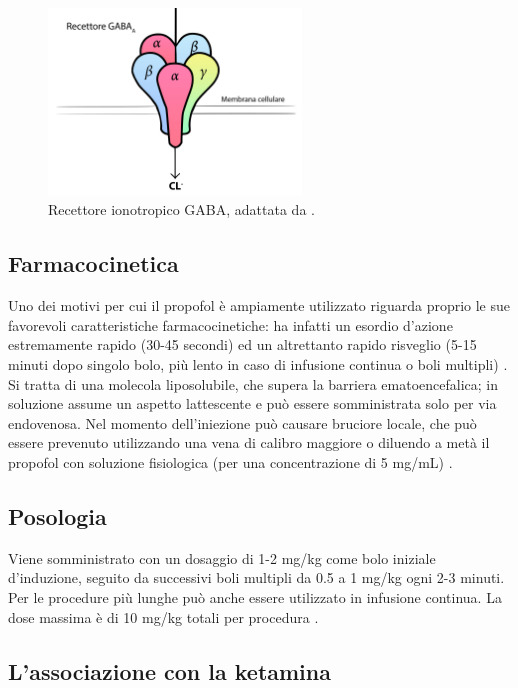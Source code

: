 \begin{figure}[h]
    \centering
    \includegraphics[width=0.6\textwidth]{Figure/GABAps.jpg}
    \caption{Recettore ionotropico GABA, adattata da \cite{vinkers2012}.}
    \label{fig:GABAps}
\end{figure}

\subsection*{Farmacocinetica}

Uno dei motivi per cui il propofol è ampiamente utilizzato riguarda proprio le sue favorevoli caratteristiche farmacocinetiche: ha infatti un esordio d'azione estremamente rapido (30-45 secondi) ed un altrettanto rapido risveglio (5-15 minuti dopo singolo bolo, più lento in caso di infusione continua o boli multipli) \cite{Simeupsedazione, Uptodatepharmacology}. Si tratta di una molecola liposolubile, che supera la barriera ematoencefalica; in soluzione assume un aspetto lattescente e può essere somministrata solo per via endovenosa. Nel momento dell'iniezione può causare bruciore locale, che può essere prevenuto utilizzando una vena di calibro maggiore o diluendo a metà il propofol con soluzione fisiologica (per una concentrazione di 5 mg/mL) \cite{Simeupsedazione}. 

\subsection*{Posologia}

Viene somministrato con un dosaggio di 1-2 mg/kg come bolo iniziale d'induzione, seguito da successivi boli multipli da 0.5 a 1 mg/kg ogni 2-3 minuti. Per le procedure più lunghe può anche essere utilizzato in infusione continua.
La dose massima è di 10 mg/kg totali per procedura \cite{Simeupsedazione}.

\subsection*{L'associazione con la ketamina}

